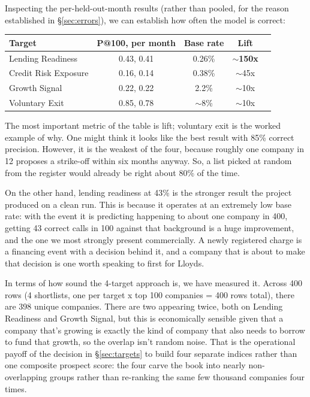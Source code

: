 \documentclass[    author={Samuel Menon Demelo; Sneha Saphala Ram Prasad; 
Viktor Ander Lindholm; Vishal Khatri},
               supervisor={Prof. Fernando Moreno-Pino},
                   degree={MSc},
                    title={Lloyds Commercial Banking Intelligence},
                 subtitle={Ranking SME Lending, Risk and Growth Prospects for Lloyds Banking Group},
                     type={},
                     year={2026}]{dissertation}
\begin{document}
Inspecting the per-held-out-month results (rather than pooled, for the reason established in \S\ref{sec:errors}), we can establish how often the model is correct:

\begin{collapsable}
\begin{table}[htbp]
\centering
\begin{tabular}{lcccc}
\hline
\textbf{Target} & \textbf{P@100, per month} & \textbf{Base rate} & \textbf{Lift\footnotemark} \\
\hline
Lending Readiness    & 0.43, 0.41 & 0.26\% & \textbf{$\sim$150x} \\
Credit Risk Exposure & 0.16, 0.14 & 0.38\% & $\sim$45x \\
Growth Signal        & 0.22, 0.22 & 2.2\%    & $\sim$10x \\
Voluntary Exit       & 0.85, 0.78 & $\sim$8\% & $\sim$10x \\
\hline
\end{tabular}
\end{table}
\end{collapsable}


The most important metric of the table is lift; voluntary exit is the worked example of why. One might think it looks like the best result with 85\% correct precision. However, it is the weakest of the four, because roughly one company in 12 proposes a strike-off within six months anyway. So, a list picked at random from the register would already be right about 80\% of the time. 

On the other hand, lending readiness at 43\% is the stronger result the project produced on a clean run. This is because it operates at an extremely low base rate: with the event it is predicting happening to about one company in 400, getting 43 correct calls in 100 against that background is a huge improvement, and the one we most strongly present commercially. A newly registered charge is a financing event with a decision behind it, and a company that is about to make that decision is one worth speaking to first for Lloyds.

In terms of how sound the 4-target approach is, we have measured it. Across 400 rows (4 shortlists, one per target x top 100 companies = 400 rows total), there are 398 unique companies. There are two appearing twice, both on Lending Readiness and Growth Signal, but this is economically sensible given that a company that's growing is exactly the kind of company that also needs to borrow to fund that growth, so the overlap isn't random noise. That is the operational payoff of the decision in \S\ref{sec:targets} to build four separate indices rather than one composite prospect score: the four carve the book into nearly non-overlapping groups rather than re-ranking the same few thousand companies four times.
\end{document}
